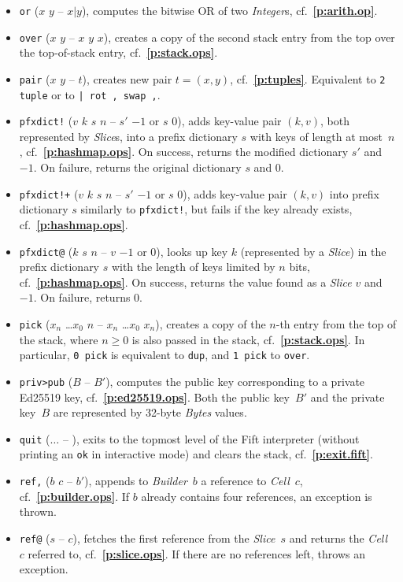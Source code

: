 \documentclass[12pt,oneside]{article}
\def\refpoint#1{{\rm\textbf{\ref{#1}}}}
\let\ptref=\refpoint
\begin{document}
\begin{itemize}
\item {\tt or} ($x$ $y$ -- $x|y$), computes the bitwise OR of two {\em Integer\/}s, cf.~\ptref{p:arith.op}.
\item {\tt over} ($x$ $y$ -- $x$ $y$ $x$), creates a copy of the second stack entry from the top over the top-of-stack entry, cf.~\ptref{p:stack.ops}.
\item {\tt pair} ($x$ $y$ -- $t$), creates new pair $t=(x,y)$, cf.~\ptref{p:tuples}. Equivalent to {\tt 2 tuple} or to {\tt | rot , swap ,}.
\item {\tt pfxdict!} ($v$ $k$ $s$ $n$ -- $s'$ $-1$ or $s$ $0$), adds key-value pair $(k,v)$, both represented by {\em Slice\/}s, into a prefix dictionary $s$ with keys of length at most~$n$, cf.~\ptref{p:hashmap.ops}. On success, returns the modified dictionary $s'$ and $-1$. On failure, returns the original dictionary $s$ and $0$.
\item {\tt pfxdict!+} ($v$ $k$ $s$ $n$ -- $s'$ $-1$ or $s$ $0$), adds key-value pair $(k,v)$ into prefix dictionary $s$ similarly to {\tt pfxdict!}, but fails if the key already exists, cf.~\ptref{p:hashmap.ops}.
\item {\tt pfxdict@} ($k$ $s$ $n$ -- $v$ $-1$ or $0$), looks up key $k$ (represented by a {\em Slice\/}) in the prefix dictionary $s$ with the length of keys limited by $n$ bits, cf.~\ptref{p:hashmap.ops}. On success, returns the value found as a {\em Slice\/} $v$ and $-1$. On failure, returns $0$.
\item {\tt pick} ($x_n$ \dots $x_0$ $n$ -- $x_n$ \dots $x_0$ $x_n$), creates a copy of the $n$-th entry from the top of the stack, where $n\geq0$ is also passed in the stack, cf.~\ptref{p:stack.ops}. In particular, {\tt 0 pick} is equivalent to {\tt dup}, and {\tt 1 pick} to {\tt over}.
\item {\tt priv>pub} ($B$ -- $B'$), computes the public key corresponding to a private Ed25519 key, cf.~\ptref{p:ed25519.ops}. Both the public key~$B'$ and the private key~$B$ are represented by 32-byte {\em Bytes\/} values.
\item {\tt quit} ($\dots$ -- ), exits to the topmost level of the Fift interpreter (without printing an {\tt ok} in interactive mode) and clears the stack, cf.~\ptref{p:exit.fift}.
\item {\tt ref,} ($b$ $c$ -- $b'$), appends to {\em Builder\/}~$b$ a reference to {\em Cell\/}~$c$, cf.~\ptref{p:builder.ops}. If $b$ already contains four references, an exception is thrown.
\item {\tt ref@} ($s$ -- $c$), fetches the first reference from the {\em Slice\/}~$s$ and returns the {\em Cell}~$c$ referred to, cf.~\ptref{p:slice.ops}. If there are no references left, throws an exception.

\end{itemize}
\end{document}
